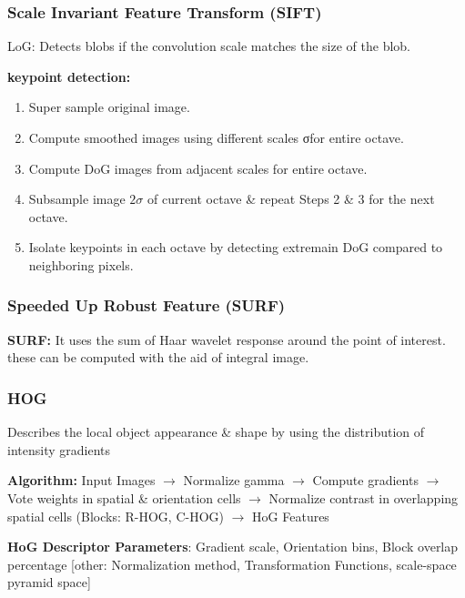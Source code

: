 \documentclass{../cheat}
\begin{document}
\begin{multicols}{3}
		\subsubsection{Scale Invariant Feature Transform (SIFT)}
		LoG: Detects blobs if the convolution scale matches the size of the blob.
		
		\textbf{keypoint detection:}
		\begin{enumerate}
			\item Super sample original image.
			\item Compute smoothed images using different scales σfor entire octave.
			\item Compute DoG images from adjacent scales for entire octave.
			\item Subsample image $2\sigma$ of current octave \& repeat Steps 2 \& 3 for the next octave.
			\item Isolate keypoints in each octave by detecting extremain DoG compared to neighboring pixels.
		\end{enumerate}

		
		\subsubsection{Speeded Up Robust Feature (SURF)}
		\textbf{SURF:} It uses the sum of Haar wavelet response around the point of interest. these can be computed with the aid of integral image.
		
		\subsubsection{HOG}
		Describes the local object appearance \& shape by using the distribution of intensity gradients
		
		\textbf{Algorithm:} Input Images $\rightarrow$ Normalize gamma $\rightarrow$ Compute gradients $\rightarrow$ Vote weights in spatial \& orientation cells $\rightarrow$ Normalize contrast in overlapping spatial cells (Blocks: R-HOG, C-HOG) $\rightarrow$ HoG Features
		
		\textbf{HoG Descriptor Parameters}: Gradient scale, Orientation bins, Block overlap percentage [other: Normalization method, Transformation Functions, scale-space pyramid space]
		
		

\end{multicols}
\end{document}

